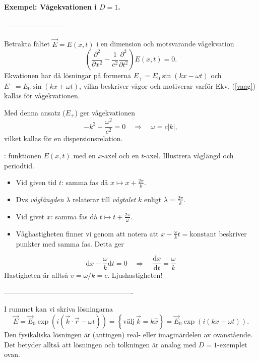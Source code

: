 \documentclass[%
oneside,                 %
final,                   %
10pt]{article}
\newcommand{\shortinlinecomment}[3]{{\color{red}{\bf #1}: #2}}
\begin{document}
\paragraph{Exempel: Vågekvationen i $D=1$.}
--------------------------

Betrakta fältet $\vec{E} = E(x,t)$ i en dimension och motsvarande vågekvation
\begin{equation}
  \left( \frac{\partial^2}{\partial x^2} - \frac{1}{c^2} \frac{\partial^2}{\partial t^2} \right) E(x,t) = 0.
\end{equation}
Ekvationen har då lösningar på formerna $E_+ = E_0 \sin(k x - \omega t)$ och $E_- = E_0 \sin(k x + \omega t)$, vilka beskriver vågor och motiverar varför Ekv. (\ref{vaag}) kallas för vågekvationen.

Med denna ansatz ($E_+$) ger vågekvationen
$$
-k^2 + \frac{\omega^2}{c^2} = 0 \quad \Rightarrow \quad \omega = c |k|,
$$
vilket kallas för en dispersionsrelation.

\shortinlinecomment{Rita 8}{ funktionen $E(x,t)$ med en $x$-axel och en $t$-axel. Illustrera våglängd och periodtid. }{ funktionen $E(x,t)$ med en }

\begin{itemize}
\item Vid given tid $t$: samma fas då $x \mapsto x + \frac{2 \pi}{k}$. 

\item Dvs \emph{våglängden} $\lambda$ relaterar till \emph{vågtalet} $k$ enligt $\lambda = \frac{2\pi}{k}$.

\item Vid givet $x$: samma fas då $t \mapsto t + \frac{2 \pi}{\omega}$. 

\item Våghastigheten finner vi genom att notera att $x-\frac{\omega}{k}t = \mathrm{konstant}$ beskriver punkter med samma fas. Detta ger
\end{itemize}

\noindent
$$
\mbox{d}x - \frac{\omega}{k} \mbox{d}t = 0 \quad \Rightarrow \quad \frac{\mbox{d}x}{\mbox{d}t} = \frac{\omega}{k}
$$
Hastigheten är alltså $v = \omega / k = c$. Ljushastigheten!

-------------------------------------------------------

I rummet kan vi skriva lösningarna
$$
\vec{E} = \vec{E}_0 \exp\left( i (\vec{k} \cdot \vec{r} - \omega t ) \right) = \left\{ \mathrm{välj~} \vec{k} = k \hat{x} \right\} = \vec{E}_0 \exp\left( i (k x - \omega t) \right).
$$
Den fysikaliska lösningen är (antingen) real- eller imaginärdelen av ovanstående. Det betyder alltså att lösningen och tolkningen är analog med $D=1$-exemplet ovan.
\end{document}
